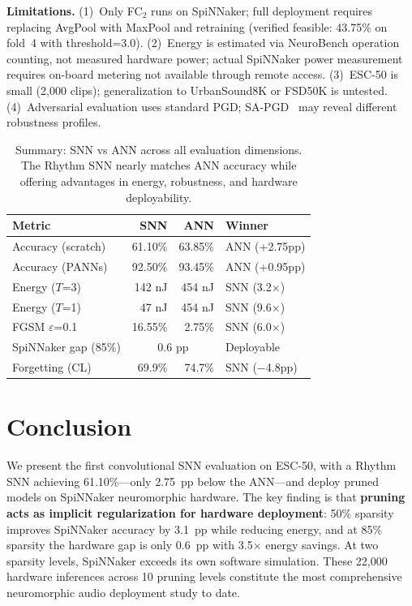 \documentclass[sigconf,nonacm=false]{acmart}
\begin{document}
\textbf{Limitations.}
(1)~Only FC$_2$ runs on SpiNNaker; full deployment requires replacing AvgPool with MaxPool and retraining (verified feasible: 43.75\% on fold~4 with threshold=3.0).
(2)~Energy is estimated via NeuroBench operation counting, not measured hardware power; actual SpiNNaker power measurement requires on-board metering not available through remote access.
(3)~ESC-50 is small (2{,}000 clips); generalization to UrbanSound8K or FSD50K is untested.
(4)~Adversarial evaluation uses standard PGD; SA-PGD~\cite{wang2025} may reveal different robustness profiles.

\begin{table}[t]
\caption{Summary: SNN vs ANN across all evaluation dimensions. The Rhythm SNN nearly matches ANN accuracy while offering advantages in energy, robustness, and hardware deployability.}
\label{tab:summary}
\small
\begin{tabular}{@{}lrrl@{}}
\toprule
Metric & SNN & ANN & Winner \\
\midrule
Accuracy (scratch) & 61.10\% & 63.85\% & ANN (+2.75pp) \\
Accuracy (PANNs) & 92.50\% & 93.45\% & ANN (+0.95pp) \\
Energy ($T$=3) & 142 nJ & 454 nJ & SNN (3.2$\times$) \\
Energy ($T$=1) & 47 nJ & 454 nJ & SNN (9.6$\times$) \\
FGSM $\varepsilon$=0.1 & 16.55\% & 2.75\% & SNN (6.0$\times$) \\
SpiNNaker gap (85\%) & \multicolumn{2}{c}{0.6 pp} & Deployable \\
Forgetting (CL) & 69.9\% & 74.7\% & SNN ($-$4.8pp) \\
\bottomrule
\end{tabular}
\end{table}

\section{Conclusion}
\label{sec:conclusion}

We present the first convolutional SNN evaluation on ESC-50, with a Rhythm SNN achieving 61.10\%---only 2.75~pp below the ANN---and deploy pruned models on SpiNNaker neuromorphic hardware.
The key finding is that \textbf{pruning acts as implicit regularization for hardware deployment}: 50\% sparsity improves SpiNNaker accuracy by 3.1~pp while reducing energy, and at 85\% sparsity the hardware gap is only 0.6~pp with 3.5$\times$ energy savings.
At two sparsity levels, SpiNNaker exceeds its own software simulation.
These 22{,}000 hardware inferences across 10 pruning levels constitute the most comprehensive neuromorphic audio deployment study to date.
\end{document}
